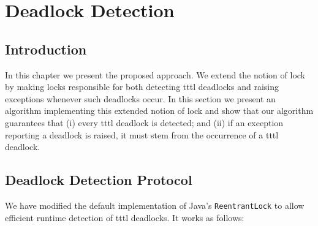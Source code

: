 \chapter{Deadlock Detection}
\label{protocol}

\section{Introduction}

In this chapter we present the proposed approach. We extend the notion of lock by making locks responsible for both detecting \ac{tttl} deadlocks and raising exceptions whenever such deadlocks occur. In this section we present an algorithm implementing this extended notion of lock and show that our algorithm guarantees that (i) every \ac{tttl} deadlock is detected; and (ii) if an exception reporting a deadlock is raised, it must stem from the occurrence of a \ac{tttl} deadlock.

\section{Deadlock Detection Protocol}

We have modified the default implementation of Java's {\tt ReentrantLock} to allow efficient runtime detection of \ac{tttl} deadlocks. It works as follows:

